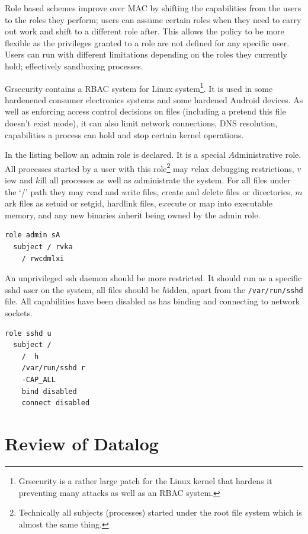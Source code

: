 \documentclass[a4paper,sfsidenotes]{%
  scrartcl%
}
\begin{document}
Role based schemes
improve over \ac{MAC} by shifting the capabilities from the users to the
roles they perform; users can assume certain roles when they need to carry out
work and shift to a different role after.  This allows the policy to be more
flexible as the privileges granted to a role are not defined for any specific
user.  Users can run with different limitations
depending on the roles they currently hold; effectively sandboxing processes.

Grsecurity contains a \ac{RBAC} system for Linux system\footnote{Grsecurity is
  a rather large patch for the Linux kernel that hardens it preventing many
  attacks as well as an \ac{RBAC} system.}.  It is used in some hardenened consumer
electronics systems and some hardened Android devices.  As well as enforcing
access control decisions on files (including a pretend this file doesn't exist
mode), it can also limit network connections, DNS
resolution, capabilities a process can hold and stop certain kernel operations.

In the listing bellow an admin role is declared.  It is a $s$pecial
$A$dministrative role.  All processes started by a user with this
role\footnote{Technically all subjects (processes) started under the root file
  system which is almost the same thing.} may $r$elax debugging restrictions,
  $v$iew and $k$ill all processes as well as $a$dministrate the system.
For all files under the `/' path they may $r$ead and $w$rite files, $c$reate and
$d$elete files or directories, $m$ark files as setuid or setgid, hardlink files,
e$x$ecute or map into executable memory, and any new binaries $i$nherit being
owned by the admin role.

\begin{lstlisting}[language=grsec]
role admin sA
  subject / rvka 
    / rwcdmlxi
\end{lstlisting}

An unprivileged ssh daemon should be more restricted.  It should run as a
specific sshd $u$ser on the system, all files should be $h$idden, apart from the
\texttt{/var/run/sshd} file.  All capabilities have been disabled as has binding
and connecting to network sockets.

\begin{lstlisting}[language=grsec]
role sshd u
  subject /
    /  h
    /var/run/sshd r
    -CAP_ALL
    bind disabled
    connect disabled
\end{lstlisting}

\section{Review of Datalog}
\label{sec:datalog}
\end{document}
